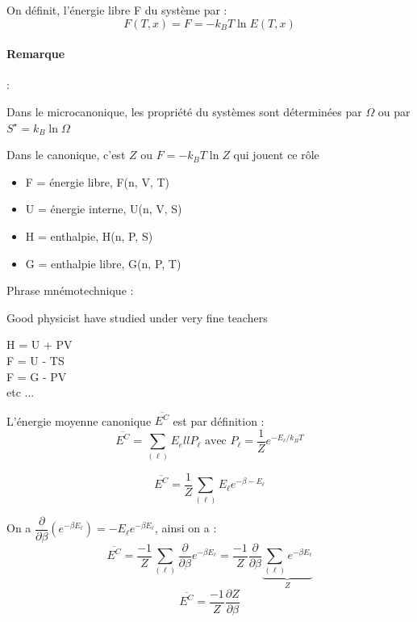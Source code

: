 \documentclass[12pt,a4paper]{report}
\begin{document}
On définit, l'énergie libre F du système par :
\[
	F(T, x) = F = -k_B T \ln E(T,x)
\]

\paragraph{Remarque } :

Dans le microcanonique, les propriété du systèmes sont déterminées par \(\Omega\) ou par \(S^\star = k_B \ln \Omega\)

Dans le canonique, c'est \(Z\) ou \(F = -k_B T \ln Z\) qui jouent ce rôle

\begin{itemize}
	\item F = énergie libre, F(n, V, T)
	\item U = énergie interne, U(n, V, S)
	\item H = enthalpie, H(n, P, S)
	\item G = enthalpie libre, G(n, P, T)
\end{itemize}

Phrase mnémotechnique :

Good physicist have studied under very fine teachers
\begin{center}


\end{center}
H = U + PV\\
F = U - TS\\
F = G - PV\\
etc ...

L'énergie moyenne canonique \(\overline{E^C}\) est par définition :
\[
	\overline{E^C} = \sum_{(\ell)} E_ell P_\ell \text{ avec } P_\ell = \dfrac{1}{Z} e^{-E_\ell / k_B T}
\]

\[
	\overline{E^C} = \dfrac{1}{Z} \sum_{(\ell)} E_\ell e^{-\beta -E_\ell}
\]

On a \(\dfrac{\partial}{\partial \beta} \left(e^{-\beta E_\ell}\right) = -E_\ell e^{-\beta E_\ell}\), ainsi on a :
\[
	\overline{E^C} = \dfrac{-1}{Z} \sum_{(\ell)} \dfrac{\partial}{\partial \beta} e^{-\beta E_\ell} = \dfrac{-1}{Z} \dfrac{\partial}{\partial \beta} \underbrace{\sum_{(\ell)} e^{-\beta E_\ell}}_Z 
\]
\[
	\overline{E^C} = \dfrac{-1}{Z} \dfrac{\partial Z}{\partial \beta}
\]
\end{document}
